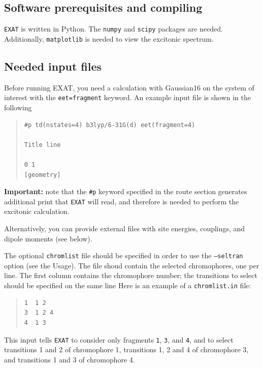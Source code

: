 \documentclass[a4paper,11pt]{article}
\begin{document}
\subsection{Software prerequisites and compiling}

\texttt{EXAT} is written in Python. The \texttt{numpy} and \texttt{scipy} packages are needed. Additionally, \texttt{matplotlib} is needed to view the excitonic spectrum.  


\subsection{Needed input files}\label{sec:input}

Before running EXAT, you need a calculation with Gaussian16 on the system of interest with the \texttt{eet=fragment} keyword. An example input file is shown in the following
\begin{quote}
\begin{verbatim}
#p td(nstates=4) b3lyp/6-31G(d) eet(fragment=4)

Title line

0 1 
[geometry]

\end{verbatim}
\end{quote}

\textbf{Important:} note that the \texttt{\#p} keyword specified in the route section generates additional print that \texttt{EXAT} will read, and therefore is needed to perform the excitonic calculation.

Alternatively, you can provide external files with site energies, couplings, and dipole moments (see below).

The optional \texttt{chromlist} file should be specified in order to use the \texttt{--seltran} option (see the Usage). The file shoud contain the selected chromophores, one per line. The first column contains the chromophore number; the transitions to select should be specified on the same line Here is an example of a \texttt{chromlist.in} file:

\begin{quote}
\begin{verbatim}
1  1 2
3  1 2 4
4  1 3
\end{verbatim}
\end{quote}

This input tells \texttt{EXAT} to consider only fragments \texttt{1}, \texttt{3}, and \texttt{4}, and to select transitions 1 and 2 of chromophore 1, transitions 1, 2 and 4 of chromophore 3, and transitions 1 and 3 of chromophore 4.
\end{document}
